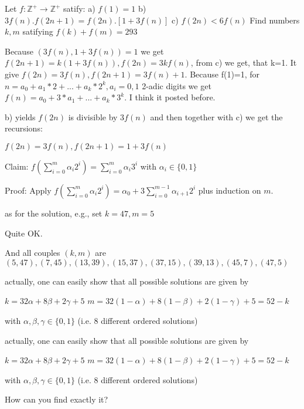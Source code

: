 \begin{mysolution}
	\begin{tcolorbox}Let $ f: \mathbb{Z}^ + \rightarrow\mathbb{Z}^ +$ satify:
a) $ f(1) = 1$
b) $ 3f(n).f(2n + 1) = f(2n).[1 + 3f(n)]$
c) $ f(2n) < 6f(n)$
Find numbers $ k,m$ satifying $ f(k) + f(m) = 293$\end{tcolorbox}
Because $ (3f(n),1+3f(n))=1$ we get $ f(2n+1)=k(1+3f(n)),f(2n)=3kf(n)$, from c) we get, that k=1.
It give $ f(2n)=3f(n),f(2n+1)=3f(n)+1$. Because f(1)=1, for $ n=a_0+a_1*2+...+a_k*2^k, a_i=0,1$ 2-adic digits we get
$ f(n)=a_0+3*a_1+...+a_k*3^k$.
I think it posted before.
\end{mysolution}



\begin{mysolution}
	\begin{tcolorbox}b) yields $ f(2n)$ is divisible by $ 3f(n)$ and then together with c) we get the recursions:

$ f(2n) = 3f(n),f(2n + 1) = 1 + 3f(n)$

Claim: $ f(\sum_{i = 0}^m\alpha_i2^i) = \sum_{i = 0}^m\alpha_i3^i$ with $ \alpha_i\in\{0,1\}$

Proof: Apply $ f(\sum_{i = 0}^m\alpha_i2^i) = \alpha_0 + 3\sum_{i = 0}^{m - 1}\alpha_{i + 1}2^i$ plus induction on $ m$.

as for the solution, e.g., set $ k = 47,m = 5$\end{tcolorbox}

Quite OK.

And all couples $ (k,m)$ are $ (5,47),(7,45),(13,39),(15,37),(37,15),(39,13),(45,7),(47,5)$
\end{mysolution}



\begin{mysolution}
	actually, one can easily show that all possible solutions are given by 

$ k=32 \alpha +8\beta+2\gamma +5$
$ m=32(1-\alpha)+8(1-\beta)+2(1-\gamma)+5=52-k$

with $ \alpha,\beta,\gamma\in\{0,1\}$ (i.e. 8 different ordered solutions)
\end{mysolution}



\begin{mysolution}
	\begin{tcolorbox}actually, one can easily show that all possible solutions are given by 

$ k = 32 \alpha + 8\beta + 2\gamma + 5$
$ m = 32(1 - \alpha) + 8(1 - \beta) + 2(1 - \gamma) + 5 = 52 - k$

with $ \alpha,\beta,\gamma\in\{0,1\}$ (i.e. 8 different ordered solutions)\end{tcolorbox}

How can you find exactly it?
\end{mysolution}




